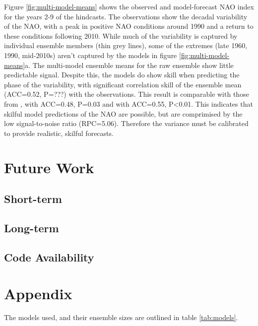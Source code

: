 \documentclass{article}
\begin{document}
Figure \ref{fig:multi-model-means} shows the observed and model-forecast NAO index for the years 2-9 of the hindcasts. The observations show the decadal variability of the NAO, with a peak in positive NAO conditions around 1990 and a return to these conditions following 2010. While much of the variability is captured by individual ensemble members (thin grey lines), some of the extremes (late 1960, 1990, mid-2010s) aren't captured by the models in figure \ref*{fig:multi-model-means}a. The multi-model ensemble means for the raw ensemble show little predictable signal. Despite this, the models do show skill when predicting the phase of the variability, with significant correlation skill of the ensemble mean (ACC=0.52, P=???) with the observations. This result is comparable with those from \cite{smith2020north}, with ACC=0.48, P=0.03 and \cite{marcheggiani2023decadal} with ACC=0.55, P<0.01. This indicates that skilful model predictions of the NAO are possible, but are comprimised by the low signal-to-noise ratio (RPC=5.06). Therefore the variance must be calibrated to provide realistic, skilful forecasts. 


\section*{Future Work}

\subsection{Short-term}

\subsection{Long-term}

\subsection*{Code Availability}

\printbibliography

\section*{Appendix}

The models used, and their ensemble sizes are outlined in table \ref{tab:models}.
\end{document}
